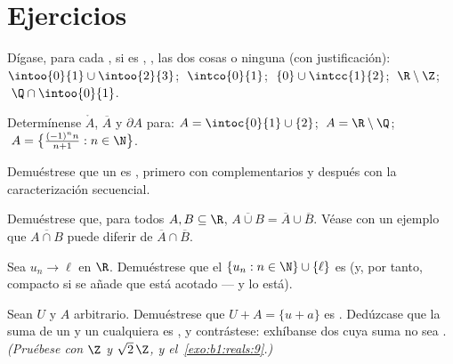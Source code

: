 \section{Ejercicios}

\begin{exercise}[$\star$]\label{exo:b1:topology:1}
Dígase, para cada , si es , , las dos cosas o
ninguna (con justificación): $\intoo{0}{1} \cup \intoo{2}{3}$;
$\;\intco{0}{1}$; $\;\{0\} \cup \intcc{1}{2}$; $\;\R \setminus \Z$;
$\;\Q \cap \intoo{0}{1}$.
\end{exercise}

\begin{exercise}[$\star$]\label{exo:b1:topology:2}
Determínense $\mathring A$, $\overline A$ y $\partial A$ para:
$A = \intoc{0}{1} \cup \{2\}$; $\;A = \R \setminus \Q$;
$\;A = \bigl\{\frac{(-1)^n n}{n+1} : n \in \N\bigr\}$.
\end{exercise}

\begin{exercise}[$\star$]\label{exo:b1:topology:3}
Demuéstrese que un  es , primero con
complementarios y después con la caracterización secuencial.
\end{exercise}

\begin{exercise}[$\star$]\label{exo:b1:topology:4}
Demuéstrese que, para todos $A, B \subseteq \R$,
$\overline{A \cup B} = \overline A \cup \overline B$. Véase con un
ejemplo que $\overline{A \cap B}$ puede diferir de
$\overline A \cap \overline B$.
\end{exercise}

\begin{exercise}[$\star\star$]\label{exo:b1:topology:5}
Sea $u_n \to \ell$ en $\R$. Demuéstrese que el 
$\{u_n : n \in \N\} \cup \{\ell\}$ es  (y, por tanto, compacto
si se añade que está acotado --- y lo está).
\end{exercise}

\begin{exercise}[$\star\star$]\label{exo:b1:topology:6}
Sean $U$  y $A$ arbitrario. Demuéstrese que $U + A = \{u + a\}$
es . Dedúzcase que la suma de un  y un 
cualquiera es , y contrástese: exhíbanse dos 
\emph{} cuya suma no sea . \emph{(Pruébese con $\Z$ y
$\sqrt 2\,\Z$, y el~\cref{exo:b1:reals:9}.)}
\end{exercise}

